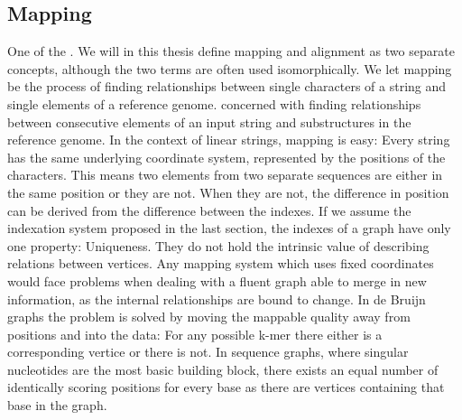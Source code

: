 \documentclass[thesis.tex]{subfiles}
\begin{document}
\subsection{Mapping}
\label{sec:mapping}
One of the . We will in this thesis define mapping and alignment as two separate concepts, although the two terms are often used isomorphically. We let mapping be the process of finding relationships between single characters of a string and single elements of a reference genome.  concerned with finding relationships between consecutive elements of an input string and substructures in the reference genome. In the context of linear strings, mapping is easy: Every string has the same underlying coordinate system, represented by the positions of the characters. This means two elements from two separate sequences are either in the same position or they are not. When they are not, the difference in position can be derived from the difference between the indexes. If we assume the indexation system proposed in the last section, the indexes of a graph have only one property: Uniqueness. They do not hold the intrinsic value of describing relations between vertices. Any mapping system which uses fixed coordinates would face problems when dealing with a fluent graph able to merge in new information, as the internal relationships are bound to change. In de Bruijn graphs the problem is solved by moving the mappable quality away from positions and into the data: For any possible k-mer there either is a corresponding vertice or there is not. In sequence graphs, where singular nucleotides are the most basic building block, there exists an equal number of identically scoring positions for every base as there are vertices containing that base in the graph.\\
\par\noindent
\end{document}
